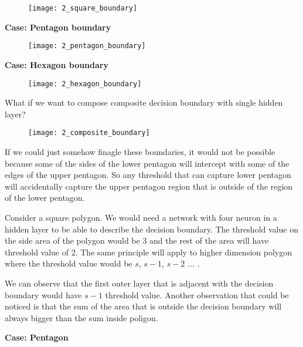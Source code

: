 \begin{figure}[H]
	\centering
	\texttt{[image: 2\_square\_boundary]}
\end{figure}

\hfill\break
\textbf{Case: Pentagon boundary}

\begin{figure}[h]
	\centering
	\texttt{[image: 2\_pentagon\_boundary]}
\end{figure}

\hfill\break
\textbf{Case: Hexagon boundary}

\begin{figure}[H]
	\centering
	\texttt{[image: 2\_hexagon\_boundary]}
\end{figure}

\hfill\break
What if we want to compose composite decision boundary with single hidden layer?

\begin{figure}[H]
	\centering
	\texttt{[image: 2\_composite\_boundary]}
\end{figure}

\hfill\linebreak
If we could just somehow finagle these boundaries, it would not be possible because some of the sides of the lower pentagon will intercept with some of the edges of the upper pentagon. So any threshold that can capture lower pentagon will accidentally capture the upper pentagon region that is outside of the region of the lower pentagon.

Consider a square polygon. We would need a network with four neuron in a hidden layer to be able to describe the decision boundary. The threshold value on the side area of the polygon would be 3 and the rest of the area will have threshold value of 2. The same principle will apply to higher dimension polygon where the threshold value would be $s$, $s-1$, $s-2$ $...$ .

We can observe that the first outer layer that is adjacent with the decision boundary would have $s-1$ threshold value. Another observation that could be noticed is that the sum of the area that is outside the decision boundary will always bigger than the sum inside poligon.

\hfill\linebreak
\textbf{Case: Pentagon}

